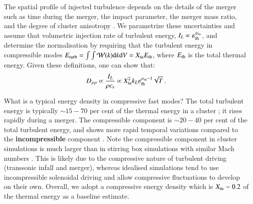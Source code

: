\documentclass[fleqn,usenatbib,useAMS]{mnras}
\newcommand\C[1]{{\bf #1}}
\newcommand{\eps}{\varepsilon}
\begin{document}
The spatial profile of injected turbulence depends on the details of the
merger such as time during the merger, the impact parameter, the
merger mass ratio, and the degree of cluster anisotropy
\citep{miniati15}. We parametrize these uncertainties and
assume that volumetric injection rate of turbulent energy,
$I_L\propto \eps_\rmn{th}^{\alpha_\rmn{tu}}$, and determine the
normalisation by requiring that the turbulent energy in compressible
modes $E_{\mathrm{turb}}=\int \int \mathcal{W}(k) {\mathrm{d}}k {\mathrm{d}}V =
X_{\mathrm{tu}} E_{\mathrm{th}}$, where $E_{\mathrm{th}}$ is the total thermal
energy. Given these definitions, one can show that: 
\begin{equation}
  \label{eq:Dpp_scaling}
  D_{pp}\propto \frac{I_L}{\rho c_{\rmn{s}}} \propto 
X_\rmn{tu}^2k_L \eps_\rmn{th}^{\alpha_\rmn{tu}-1}\sqrt{T}\,.
\end{equation}

What is a typical energy density in compressive fast modes? The total turbulent
energy is typically $\sim 15-70$ per cent of the thermal energy in a cluster
\citep{vazza11}; it rises rapidly during a merger. The compressible component is
$\sim 20-40$ per cent of the total turbulent energy, and shows more rapid temporal
variations compared to the \C{incompressible} component
\citep{2013ApJ...771..131B,miniati15}. Note the compressible component in
cluster simulations is much larger than in stirring box simulations
with similar Mach numbers \citep{kowal10,lynn14}. This is likely due to the
compressive nature of turbulent driving (transsonic infall and merger), whereas
idealised simulations tend to use incompressible solenoidal driving and allow
compressive fluctuations to develop on their own. Overall, we adopt a
compressive energy density which is $X_{\rm tu} \sim 0.2$ of the thermal energy
as a baseline estimate.
\end{document}

